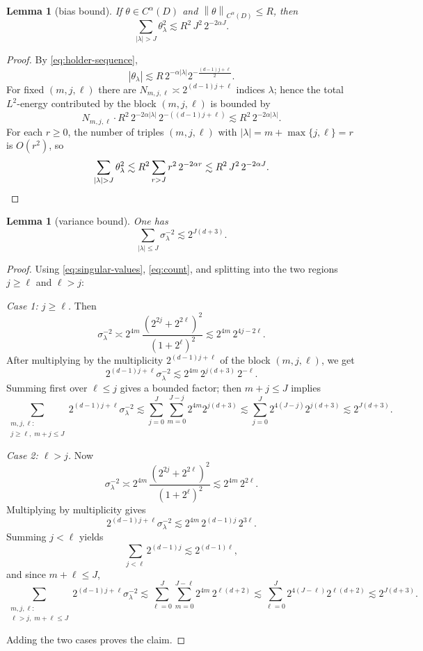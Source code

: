 \documentclass[11pt]{article}
\newtheorem{lemma}[theorem]{Lemma}
\newcommand{\1}{\mathbf 1}
\newcommand{\norm}[1]{\left\|#1\right\|}
\begin{document}
\begin{lemma}[bias bound]\label{lem:bias}
If $\theta\in C^\alpha(D)$ and $\norm{\theta}_{C^\alpha(D)}\le R$, then
\[
\sum_{|\lambda|>J}\theta_\lambda^2
\lesssim
R^2\,J^2\,2^{-2\alpha J}.
\]
\end{lemma}

\begin{proof}
By \eqref{eq:holder-sequence},
\[
|\theta_\lambda|
\lesssim
R\,
2^{-\alpha|\lambda|}
2^{-\frac{(d-1)j+\ell}{2}}.
\]
For fixed $(m,j,\ell)$ there are $N_{m,j,\ell}\asymp 2^{(d-1)j+\ell}$ indices $\lambda$; hence the total $L^2$-energy contributed by the block $(m,j,\ell)$ is bounded by
\[
N_{m,j,\ell}\cdot
R^2\,2^{-2\alpha|\lambda|}\,2^{-((d-1)j+\ell)}
\lesssim
R^2\,2^{-2\alpha|\lambda|}.
\]
For each $r\ge0$, the number of triples $(m,j,\ell)$ with $|\lambda|=m+\max\{j,\ell\}=r$ is $O(r^2)$, so
\[
\sum_{|\lambda|>J}\theta_\lambda^2
\lesssim
R^2\sum_{r>J} r^2\,2^{-2\alpha r}
\lesssim
R^2\,J^2\,2^{-2\alpha J}.
\qedhere
\]
\end{proof}

\begin{lemma}[variance bound]\label{lem:variance}
One has
\[
\sum_{|\lambda|\le J}\sigma_\lambda^{-2}
\lesssim
2^{J(d+3)}.
\]
\end{lemma}

\begin{proof}
Using \eqref{eq:singular-values}, \eqref{eq:count}, and splitting into the two regions $j\ge \ell$ and $\ell>j$:

\medskip
\noindent\emph{Case 1: $j\ge \ell$.}
Then
\[
\sigma_\lambda^{-2}
\asymp
2^{4m}\,\frac{(2^{2j}+2^{2\ell})^2}{(1+2^\ell)^2}
\lesssim
2^{4m}\,2^{4j-2\ell}.
\]
After multiplying by the multiplicity $2^{(d-1)j+\ell}$ of the block $(m,j,\ell)$, we get
\[
2^{(d-1)j+\ell}\sigma_\lambda^{-2}
\lesssim
2^{4m}\,2^{j(d+3)}\,2^{-\ell}.
\]
Summing first over $\ell\le j$ gives a bounded factor; then $m+j\le J$ implies
\[
\sum_{\substack{m,j,\ell:\\ j\ge\ell,\;m+j\le J}}
2^{(d-1)j+\ell}\sigma_\lambda^{-2}
\lesssim
\sum_{j=0}^J\sum_{m=0}^{J-j}2^{4m}2^{j(d+3)}
\lesssim
\sum_{j=0}^J 2^{4(J-j)}2^{j(d+3)}
\lesssim
2^{J(d+3)}.
\]

\medskip
\noindent\emph{Case 2: $\ell>j$.}
Now
\[
\sigma_\lambda^{-2}
\asymp
2^{4m}\,\frac{(2^{2j}+2^{2\ell})^2}{(1+2^\ell)^2}
\lesssim
2^{4m}\,2^{2\ell}.
\]
Multiplying by multiplicity gives
\[
2^{(d-1)j+\ell}\sigma_\lambda^{-2}
\lesssim
2^{4m}\,2^{(d-1)j}\,2^{3\ell}.
\]
Summing $j<\ell$ yields
\[
\sum_{j<\ell}2^{(d-1)j}\lesssim 2^{(d-1)\ell},
\]
and since $m+\ell\le J$,
\[
\sum_{\substack{m,j,\ell:\\ \ell>j,\;m+\ell\le J}}
2^{(d-1)j+\ell}\sigma_\lambda^{-2}
\lesssim
\sum_{\ell=0}^J\sum_{m=0}^{J-\ell}2^{4m}\,2^{\ell(d+2)}
\lesssim
\sum_{\ell=0}^J 2^{4(J-\ell)}2^{\ell(d+2)}
\lesssim
2^{J(d+3)}.
\]

Adding the two cases proves the claim.
\end{proof}
\end{document}
